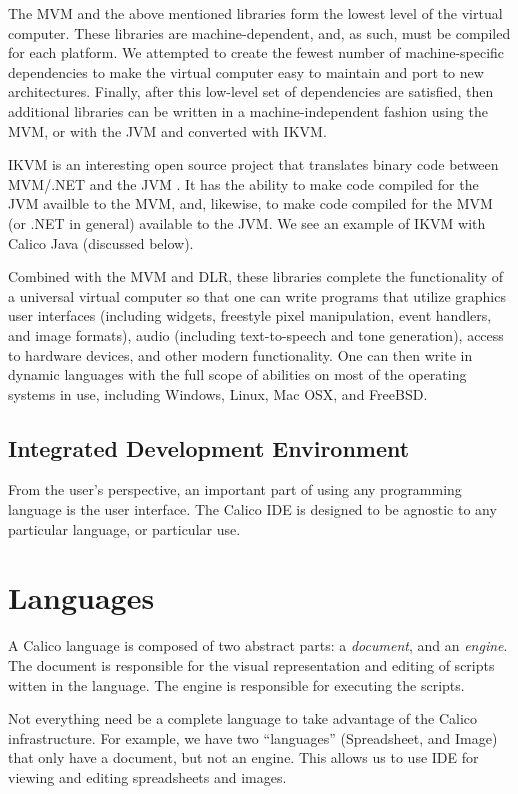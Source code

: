 \documentclass[preprint]{sigplanconf}
\begin{document}
The MVM and the above mentioned libraries form the lowest level of the
virtual computer. These libraries are machine-dependent, and, as such,
must be compiled for each platform. We attempted to create the fewest
number of machine-specific dependencies to make the virtual computer
easy to maintain and port to new architectures.  Finally, after this
low-level set of dependencies are satisfied, then additional libraries
can be written in a machine-independent fashion using the MVM, or with
the JVM and converted with IKVM.

IKVM is an interesting open source project that translates binary code
between MVM/.NET and the JVM \cite{ikvm}. It has the ability to make
code compiled for the JVM availble to the MVM, and, likewise, to make
code compiled for the MVM (or .NET in general) available to the
JVM. We see an example of IKVM with Calico Java (discussed below).

Combined with the MVM and DLR, these libraries complete the
functionality of a universal virtual computer so that one can write
programs that utilize graphics user interfaces (including widgets,
freestyle pixel manipulation, event handlers, and image formats),
audio (including text-to-speech and tone generation), access to
hardware devices, and other modern functionality. One can then write
in dynamic languages with the full scope of abilities on most of the
operating systems in use, including Windows, Linux, Mac OSX, and
FreeBSD.

\subsection{Integrated Development Environment}

From the user's perspective, an important part of using any
programming language is the user interface. The Calico IDE is designed
to be agnostic to any particular language, or particular use.

\section{Languages}

A Calico language is composed of two abstract parts: a
\textit{document}, and an \textit{engine}. The document is responsible
for the visual representation and editing of scripts witten in the
language. The engine is responsible for executing the scripts.

Not everything need be a complete language to take advantage of the
Calico infrastructure. For example, we have two ``languages''
(Spreadsheet, and Image) that only have a document, but not an
engine. This allows us to use IDE for viewing and editing spreadsheets
and images.
\end{document}
